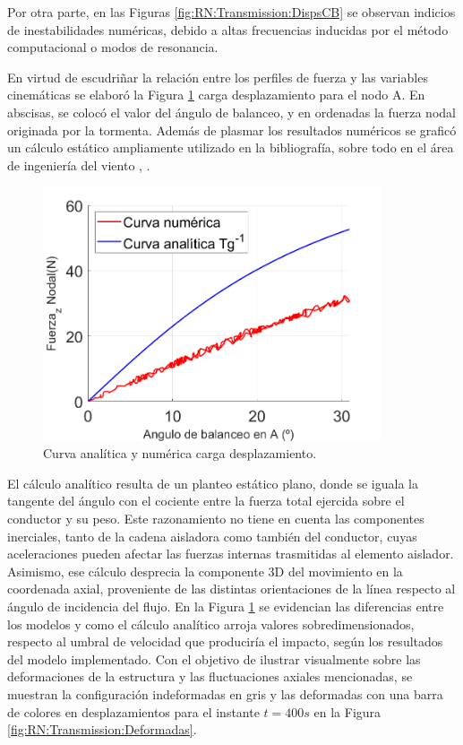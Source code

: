 Por otra parte, en las Figuras \ref{fig:RN:Transmission:DispsCB} se observan indicios de inestabilidades numéricas, debido a altas frecuencias inducidas por el método computacional o modos de resonancia.

En virtud de escudriñar la relación entre los perfiles de fuerza y las variables cinemáticas se elaboró la Figura \ref{fig:RN:Trnamission:CurvaCargaDisp} carga desplazamiento para el nodo A. En abscisas, se colocó el valor del ángulo de balanceo, y en ordenadas la fuerza nodal originada por la tormenta. Además de plasmar los resultados numéricos se graficó un cálculo estático ampliamente utilizado en la bibliografía, sobre todo en el área de ingeniería del viento \citep{stengel2017measurements}, \citep{duranona2009analysis} \citep{yang2016nonlinear}.


\begin{figure}[htbp]
	\centering
	\includegraphics[width=100mm]{./imagenes/ResultadosNumericos/TransmissionTormenta/FuerzaAngulo_TS.png}
	\caption{Curva analítica y numérica carga desplazamiento.}
	\label{fig:RN:Trnamission:CurvaCargaDisp}
\end{figure}

El cálculo analítico resulta de un planteo estático plano, donde se iguala la tangente del ángulo con el cociente entre la fuerza total ejercida sobre el conductor y su peso. Este razonamiento no tiene en cuenta las componentes inerciales, tanto de la cadena aisladora como también del conductor, cuyas aceleraciones pueden afectar las fuerzas internas trasmitidas al elemento aislador. Asimismo, ese cálculo desprecia la componente 3D del movimiento en la coordenada axial, proveniente de las distintas orientaciones de la línea respecto al ángulo de incidencia del flujo. En la Figura \ref{fig:RN:Trnamission:CurvaCargaDisp} se evidencian las diferencias entre los modelos y como el cálculo analítico arroja valores sobredimensionados, respecto al umbral de velocidad que produciría el impacto, según los resultados del modelo implementado. Con el objetivo de ilustrar visualmente sobre las deformaciones de la estructura y las fluctuaciones axiales mencionadas, se muestran la configuración indeformadas en gris y las deformadas con una barra de colores en desplazamientos para el instante $t=400 s$ en la Figura \ref{fig:RN:Transmission:Deformadas}.


